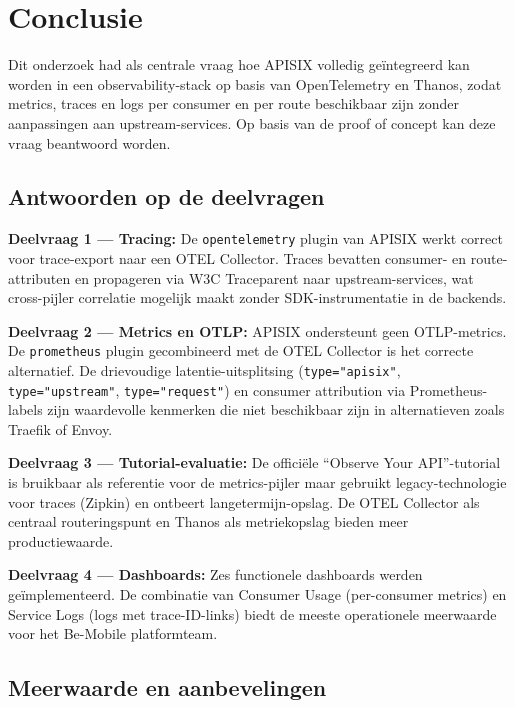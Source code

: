 
\chapter{Conclusie}%
\label{ch:conclusie}

Dit onderzoek had als centrale vraag hoe APISIX volledig geïntegreerd kan worden in een observability-stack op basis van OpenTelemetry en Thanos, zodat metrics, traces en logs per consumer en per route beschikbaar zijn zonder aanpassingen aan upstream-services. Op basis van de proof of concept kan deze vraag beantwoord worden.

\section{Antwoorden op de deelvragen}

\textbf{Deelvraag 1 --- Tracing:} De \texttt{opentelemetry} plugin van APISIX werkt correct voor trace-export naar een OTEL Collector. Traces bevatten consumer- en route-attributen en propageren via W3C Traceparent naar upstream-services, wat cross-pijler correlatie mogelijk maakt zonder SDK-instrumentatie in de backends.

\textbf{Deelvraag 2 --- Metrics en OTLP:} APISIX ondersteunt geen OTLP-metrics. De \texttt{prometheus} plugin gecombineerd met de OTEL Collector is het correcte alternatief. De drievoudige latentie-uitsplitsing (\texttt{type="apisix"}, \texttt{type="upstream"}, \texttt{type="request"}) en consumer attribution via Prometheus-labels zijn waardevolle kenmerken die niet beschikbaar zijn in alternatieven zoals Traefik of Envoy.

\textbf{Deelvraag 3 --- Tutorial-evaluatie:} De officiële ``Observe Your API''-tutorial is bruikbaar als referentie voor de metrics-pijler maar gebruikt legacy-technologie voor traces (Zipkin) en ontbeert langetermijn-opslag. De OTEL Collector als centraal routeringspunt en Thanos als metriekopslag bieden meer productiewaarde.

\textbf{Deelvraag 4 --- Dashboards:} Zes functionele dashboards werden geïmplementeerd. De combinatie van Consumer Usage (per-consumer metrics) en Service Logs (logs met trace-ID-links) biedt de meeste operationele meerwaarde voor het Be-Mobile platformteam.

\section{Meerwaarde en aanbevelingen}


